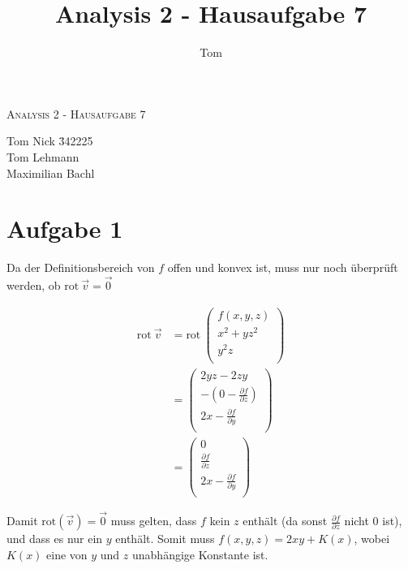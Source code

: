 \documentclass[10pt,a4paper,parskip=half]{scrartcl}
\author{Tom}
\title{Analysis 2 - Hausaufgabe 7}
\newcommand{\vecthree}[3]{\begin{pmatrix}#1\\#2\\#3\\\end {pmatrix}}
\begin{document}
\begin{center}
\textsc{\Large{Analysis 2 - Hausaufgabe 7}} \\
\end{center}
\begin{tabbing}
Tom Nick \hspace{1.4cm}\= 342225\\
Tom Lehmann\\
Maximilian Bachl
\end{tabbing}
\section*{Aufgabe 1}
Da der Definitionsbereich von $f$ offen und konvex ist, muss nur noch überprüft werden, ob $\text{rot}\ \vec v = \vec 0$

\begin{align*}
\text{rot}\ \vec v &= \text{rot}\ \vecthree{f(x,y,z)}{x^2 + yz^2}{y^2z}\\
&= \vecthree{2yz - 2zy}{-(0-\frac{\partial f}{\partial z})}{2x - \frac{\partial f}{\partial y}}\\
&= \vecthree{0}{\frac{\partial f}{\partial z}}{2x - \frac{\partial f}{\partial y}}
\end{align*}

Damit $\text{rot}(\vec v) = \vec 0$ muss gelten, dass $f$ kein $z$ enthält (da sonst $\frac{\partial f}{\partial z}$ nicht 0 ist), und dass es nur ein $y$ enthält. Somit muss $f(x,y,z) = 2xy + K(x)$, wobei $K(x)$ eine von $y$ und $z$ unabhängige Konstante ist.
\end{document}
